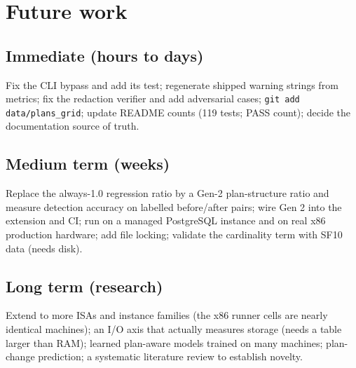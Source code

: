 \section{Future work}
\subsection{Immediate (hours to days)}
Fix the CLI bypass and add its test; regenerate shipped warning strings from metrics; fix the redaction verifier and add adversarial cases; \texttt{git add} \texttt{data/plans\_grid}; update README counts (119 tests; PASS count); decide the documentation source of truth.
\subsection{Medium term (weeks)}
Replace the always-1.0 regression ratio by a Gen-2 plan-structure ratio and measure detection accuracy on labelled before/after pairs; wire Gen 2 into the extension and CI; run on a managed PostgreSQL instance and on real x86 production hardware; add file locking; validate the cardinality term with SF10 data (needs disk).
\subsection{Long term (research)}
Extend to more ISAs and instance families (the x86 runner cells are nearly identical machines); an I/O axis that actually measures storage (needs a table larger than RAM); learned plan-aware models trained on many machines; plan-change prediction; a systematic literature review to establish novelty.

